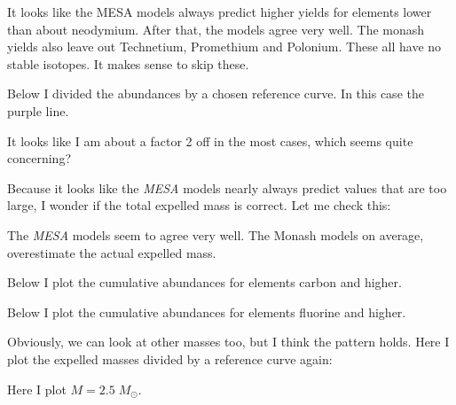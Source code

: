 \documentclass[a4paper,10pt]{article}
\begin{document}
It looks like the MESA models always predict higher yields for elements lower than about neodymium. After that, the models agree very well.
The monash yields also leave out Technetium, Promethium and Polonium. These all have no stable isotopes. It makes sense to skip these.

Below I divided the abundances by a chosen reference curve. In this case the purple line.
\begin{figure}[ht]
    \centering
\end{figure}

It looks like I am about a factor 2 off in the most cases, which seems quite concerning?

Because it looks like the \emph{MESA} models nearly always predict values that are too large, I wonder if the total expelled mass is correct.
Let me check this:

\begin{figure}[ht]
    \centering
\end{figure}

The \emph{MESA} models seem to agree very well. The Monash models on average, overestimate the actual expelled mass. 

\nextpage
\begin{figure}[ht]
    \centering
\end{figure}

Below I plot the cumulative abundances for elements carbon and higher.

\begin{figure}[ht]
    \centering
\end{figure}

Below I plot the cumulative abundances for elements fluorine and higher.

\begin{figure}[ht]
    \centering
\end{figure}

Obviously, we can look at other masses too, but I think the pattern holds. Here I plot the expelled masses divided by a reference curve again:
\begin{figure}[ht]
    \centering
\end{figure}

Here I plot \(M=2.5\; M_\odot \).

\begin{figure}[ht]
    \centering
\end{figure}
\end{document}

